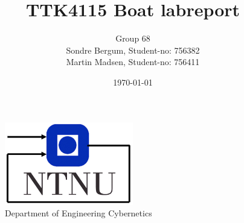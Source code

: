 \documentclass[11pt, a4paper, USenglish]{article} %
\begin{document}
\title{TTK4115 Boat labreport}
\author{Group 68\\Sondre Bergum, Student-no: 756382 \\Martin Madsen, Student-no: 756411}
\date{\today}
\begin{titlepage}
    \maketitle
    \begin{figure}
    \centering
    \includegraphics[width=0.5\textwidth]{figures/itk_ntnu}\\
    Department of Engineering Cybernetics
    \end{figure}
    \thispagestyle{empty}
\end{titlepage}

\newpage

\thispagestyle{empty} %

\newpage
\tableofcontents
\thispagestyle{empty} %

\newpage
\setcounter{page}{1}










\newpage
{}
\printbibliography{}
\label{sec:bibliography}
\thispagestyle{empty} %
\end{document}
